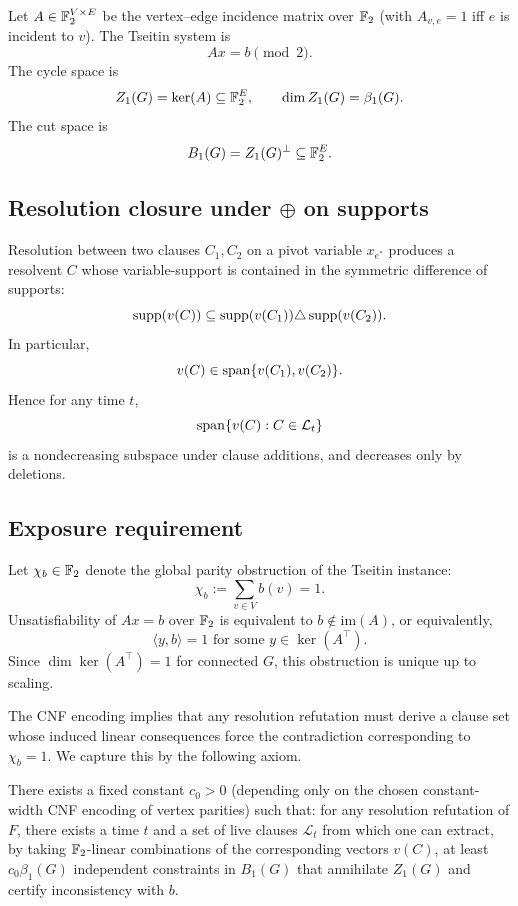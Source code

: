 Let $A\in\mathbb{F}_2^{V\times E}$ be the vertex--edge incidence matrix over $\mathbb{F}_2$ (with $A_{v,e}=1$ iff $e$ is incident to $v$).
The Tseitin system is
\[
A x = b \pmod 2.
\]
The cycle space is
\[
Z_1(G)=\ker(A)\subseteq \mathbb{F}_2^E,\qquad \dim Z_1(G)=\beta_1(G).
\]
The cut space is
\[
B_1(G)=Z_1(G)^\perp \subseteq \mathbb{F}_2^E.
\]

\subsection{Resolution closure under $\oplus$ on supports}

Resolution between two clauses $C_1,C_2$ on a pivot variable $x_{e^\ast}$ produces a resolvent $C$ whose variable-support is contained in the symmetric difference of supports:
\[
\operatorname{supp}(v(C)) \subseteq \operatorname{supp}(v(C_1))\triangle \operatorname{supp}(v(C_2)).
\]
In particular,
\[
v(C)\in \operatorname{span}\{v(C_1),v(C_2)\}.
\]
Hence for any time $t$,
\[
\operatorname{span}\{v(C):C\in\mathcal{L}_t\}
\]
is a nondecreasing subspace under clause additions, and decreases only by deletions.

\subsection{Exposure requirement}

Let $\chi_b\in\mathbb{F}_2$ denote the global parity obstruction of the Tseitin instance:
\[
\chi_b:=\sum_{v\in V} b(v)=1.
\]
Unsatisfiability of $A x=b$ over $\mathbb{F}_2$ is equivalent to $b\notin \mathrm{im}(A)$, or equivalently,
\[
\langle y,b\rangle = 1 \text{ for some } y\in\ker(A^\top).
\]
Since $\dim\ker(A^\top)=1$ for connected $G$, this obstruction is unique up to scaling.

The CNF encoding implies that any resolution refutation must derive a clause set whose induced linear consequences force the contradiction corresponding to $\chi_b=1$.
We capture this by the following axiom.

\begin{lemma}
\label{lem:parity-exposure-axiom}
There exists a fixed constant $c_0>0$ (depending only on the chosen constant-width CNF encoding of vertex parities) such that:
for any resolution refutation of $F$, there exists a time $t$ and a set of live clauses $\mathcal{L}_t$ from which one can extract, by taking $\mathbb{F}_2$-linear combinations of the corresponding vectors $v(C)$, at least $c_0\beta_1(G)$ independent constraints in $B_1(G)$ that annihilate $Z_1(G)$ and certify inconsistency with $b$.
\end{lemma}

